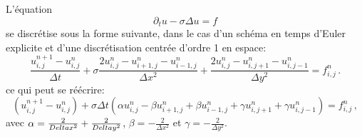 \documentclass[11pt]{article}
\begin{document}
L'équation 
\begin{equation}
	\partial_t u - \sigma \Delta u = f
\end{equation}
se discrétise sous la forme suivante, dans le cas d'un schéma en temps d'Euler explicite et d'une discrétisation centrée d'ordre 1 en espace:
\begin{equation}
  \frac{u^{n+1}_{i,j}-u^{n}_{i,j}}{\Delta t} + \sigma \frac{2u^{n}_{i,j}-u^{n}_{i+1,j}-u^{n}_{i-1,j}}{\Delta x^2} + \frac{2u^{n}_{i,j} - u^{n}_{i,j+1} - u^{n}_{i,j-1}}{\Delta y^2} = f^{n}_{i,j} \,.
\end{equation}
ce qui peut se réécrire:
\begin{equation}
 (u^{n+1}_{i,j}-u^{n}_{i,j}) + \sigma\Delta t\left(\alpha u^{n}_{i,j} - \beta u^{n}_{i+1,j} +  \beta u^{n}_{i-1,j} + \gamma u^{n}_{i,j+1} +  \gamma u^{n}_{i,j-1}\right) = f^{n}_{i,j} \,,
\end{equation}
avec $\alpha = \frac{2}{\\Delta x^2} + \frac{2}{\\Delta y^2}$, $\beta = -\frac{2}{\Delta x^2}$ et $\gamma = -\frac{2}{\Delta y^2}$.
\end{document}
